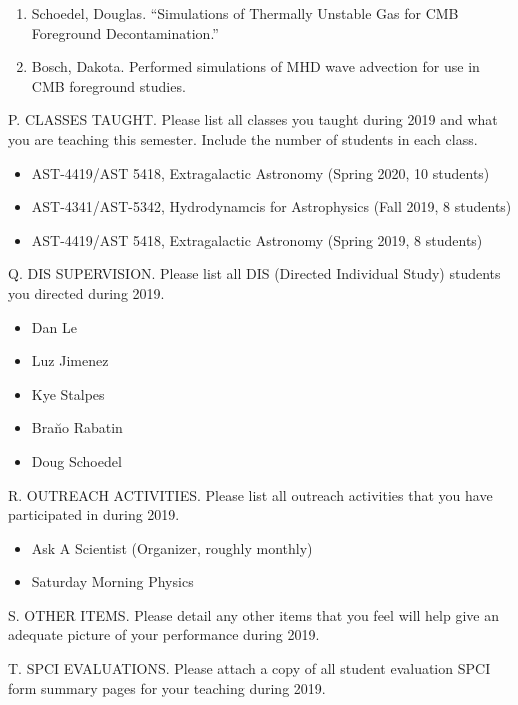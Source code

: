 \begin{enumerate}
    \item Schoedel, Douglas.  ``Simulations of Thermally Unstable Gas for CMB
        Foreground Decontamination.''
    \item Bosch, Dakota.  Performed simulations of MHD wave advection for use in
        CMB foreground studies.
\end{enumerate}

\noindent P. CLASSES TAUGHT. Please list all classes you taught
during 2019 and what you are teaching this semester.  Include the
number of students in each class.
\bigskip

\begin{itemize}
\item AST-4419/AST 5418, Extragalactic Astronomy (Spring 2020, 10 students) 
\item AST-4341/AST-5342, Hydrodynamcis for Astrophysics (Fall 2019, 8 students)
\item AST-4419/AST 5418, Extragalactic Astronomy (Spring 2019, 8 students) 
\end{itemize}

\noindent Q. DIS SUPERVISION. Please list all DIS (Directed
Individual Study) students you directed during 2019.
\bigskip

\begin{itemize}
    \item Dan Le
    \item Luz Jimenez
    \item Kye Stalpes
    \item Bra\u{n}o Rabatin
    \item Doug Schoedel
\end{itemize}

\noindent R. OUTREACH ACTIVITIES. Please list all outreach
activities that you have participated in during 2019.
\bigskip

\begin{itemize}
    \item Ask A Scientist (Organizer, roughly monthly)
    \item Saturday Morning Physics
\end{itemize}

\noindent S. OTHER ITEMS. Please detail any other items that you
feel will help give an adequate picture of your performance during
2019.
\bigskip

\noindent T.  SPCI EVALUATIONS. Please attach a copy of all student
evaluation SPCI form summary pages for your teaching during 2019.







